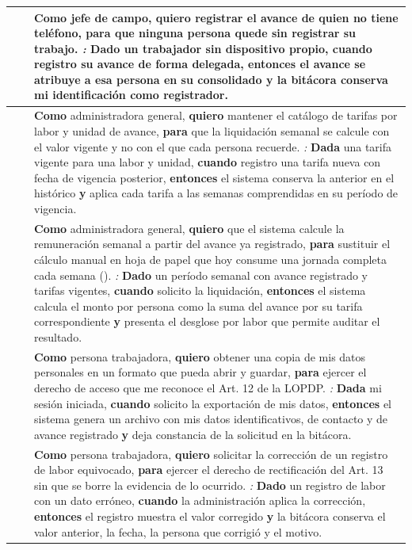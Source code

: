 \begin{longtable}{|C{1.3cm}|C{1.3cm}|L{12.4cm}|}
 &  & \textbf{Como} jefe de campo, \textbf{quiero} registrar el avance de quien no tiene teléfono, \textbf{para} que ninguna persona quede sin registrar su trabajo. \newline \emph{:} \textbf{Dado} un trabajador sin dispositivo propio, \textbf{cuando} registro su avance de forma delegada, \textbf{entonces} el avance se atribuye a esa persona en su consolidado \textbf{y} la bitácora conserva mi identificación como registrador. \\ \hline
{} &  & \textbf{Como} administradora general, \textbf{quiero} mantener el catálogo de tarifas por labor y unidad de avance, \textbf{para} que la liquidación semanal se calcule con el valor vigente y no con el que cada persona recuerde. \newline \emph{:} \textbf{Dada} una tarifa vigente para una labor y unidad, \textbf{cuando} registro una tarifa nueva con fecha de vigencia posterior, \textbf{entonces} el sistema conserva la anterior en el histórico \textbf{y} aplica cada tarifa a las semanas comprendidas en su período de vigencia. \\ \hline
{} &  & \textbf{Como} administradora general, \textbf{quiero} que el sistema calcule la remuneración semanal a partir del avance ya registrado, \textbf{para} sustituir el cálculo manual en hoja de papel que hoy consume una jornada completa cada semana (). \newline \emph{:} \textbf{Dado} un período semanal con avance registrado y tarifas vigentes, \textbf{cuando} solicito la liquidación, \textbf{entonces} el sistema calcula el monto por persona como la suma del avance por su tarifa correspondiente \textbf{y} presenta el desglose por labor que permite auditar el resultado. \\ \hline
{} &  & \textbf{Como} persona trabajadora, \textbf{quiero} obtener una copia de mis datos personales en un formato que pueda abrir y guardar, \textbf{para} ejercer el derecho de acceso que me reconoce el Art. 12 de la LOPDP. \newline \emph{:} \textbf{Dada} mi sesión iniciada, \textbf{cuando} solicito la exportación de mis datos, \textbf{entonces} el sistema genera un archivo con mis datos identificativos, de contacto y de avance registrado \textbf{y} deja constancia de la solicitud en la bitácora. \\ \hline
{} &  & \textbf{Como} persona trabajadora, \textbf{quiero} solicitar la corrección de un registro de labor equivocado, \textbf{para} ejercer el derecho de rectificación del Art. 13 sin que se borre la evidencia de lo ocurrido. \newline \emph{:} \textbf{Dado} un registro de labor con un dato erróneo, \textbf{cuando} la administración aplica la corrección, \textbf{entonces} el registro muestra el valor corregido \textbf{y} la bitácora conserva el valor anterior, la fecha, la persona que corrigió y el motivo. \\ \hline

\end{longtable}
